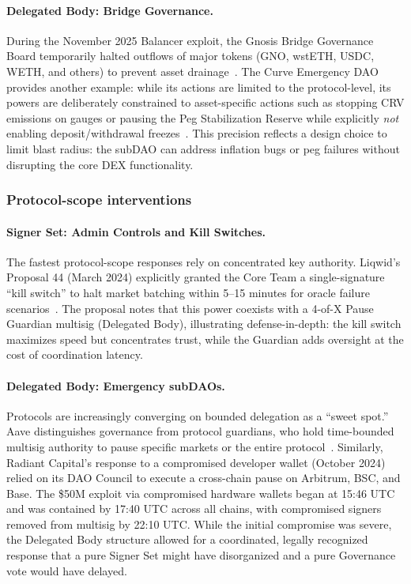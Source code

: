 \documentclass[12pt]{article}
\begin{document}
\paragraph{Delegated Body: Bridge Governance.}
During the November 2025 Balancer exploit, the Gnosis Bridge Governance Board temporarily halted outflows of major tokens (GNO, wstETH, USDC, WETH, and others) to prevent asset drainage~\cite{Gnosis2025BalancerHack}. The Curve Emergency DAO provides another example: while its actions are limited to the protocol-level, its powers are deliberately constrained to asset-specific actions such as stopping CRV emissions on gauges or pausing the Peg Stabilization Reserve while explicitly \emph{not} enabling deposit/withdrawal freezes~\cite{CurveExploitLlamaRisk}. This precision reflects a design choice to limit blast radius: the subDAO can address inflation bugs or peg failures without disrupting the core DEX functionality.

\subsubsection{Protocol-scope interventions}
\label{sec:incidents-protocol}

\paragraph{Signer Set: Admin Controls and Kill Switches.}
The fastest protocol-scope responses rely on concentrated key authority. Liqwid's Proposal 44 (March 2024) explicitly granted the Core Team a single-signature ``kill switch'' to halt market batching within 5--15 minutes for oracle failure scenarios~\cite{Liqwid2024Governance}. The proposal notes that this power coexists with a 4-of-X Pause Guardian multisig (Delegated Body), illustrating defense-in-depth: the kill switch maximizes speed but concentrates trust, while the Guardian adds oversight at the cost of coordination latency.

\paragraph{Delegated Body: Emergency subDAOs.}
Protocols are increasingly converging on bounded delegation as a ``sweet spot.'' Aave distinguishes governance from protocol guardians, who hold time-bounded multisig authority to pause specific markets or the entire protocol~\cite{AaveGuardians,AaveACLManager}. Similarly, Radiant Capital's response to a compromised developer wallet (October 2024) relied on its DAO Council to execute a cross-chain pause on Arbitrum, BSC, and Base. The \$50M exploit via compromised hardware wallets began at 15:46 UTC and was contained by 17:40 UTC across all chains, with compromised signers removed from multisig by 22:10 UTC. While the initial compromise was severe, the Delegated Body structure allowed for a coordinated, legally recognized response that a pure Signer Set might have disorganized and a pure Governance vote would have delayed.
\end{document}
